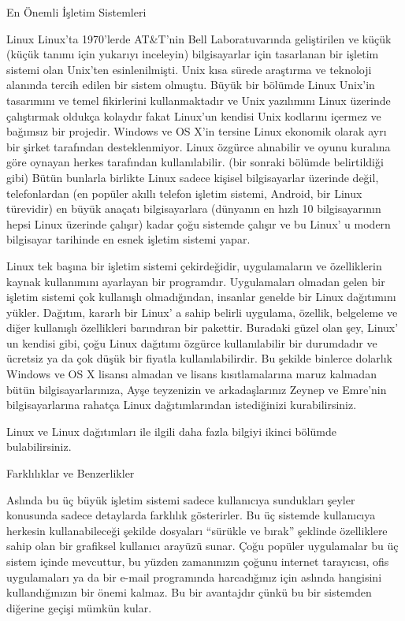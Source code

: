 \begin{section}{En Önemli İşletim Sistemleri}
\begin{subsection}{Linux}
Linux'ta 1970'lerde AT\&T'nin Bell Laboratuvarında geliştirilen ve küçük (küçük tanımı için yukarıyı inceleyin) bilgisayarlar için tasarlanan bir işletim sistemi olan Unix'ten esinlenilmişti. Unix kısa sürede araştırma ve teknoloji alanında tercih edilen bir sistem olmuştu. Büyük bir bölümde Linux Unix'in tasarımını ve temel fikirlerini kullanmaktadır ve Unix yazılımını Linux üzerinde çalıştırmak oldukça kolaydır fakat Linux'un kendisi Unix kodlarını içermez ve bağımsız bir projedir. Windows ve OS X'in tersine Linux ekonomik olarak ayrı bir şirket tarafından desteklenmiyor. Linux özgürce alınabilir ve oyunu kuralına göre oynayan herkes tarafından kullanılabilir. (bir sonraki bölümde belirtildiği gibi) Bütün bunlarla birlikte Linux sadece kişisel bilgisayarlar üzerinde değil, telefonlardan (en popüler akıllı telefon işletim sistemi, Android, bir Linux türevidir) en büyük anaçatı bilgisayarlara (dünyanın en hızlı 10 bilgisayarının hepsi Linux üzerinde çalışır) kadar çoğu sistemde çalışır ve bu Linux' u modern bilgisayar tarihinde en esnek işletim sistemi yapar.

Linux tek başına bir işletim sistemi çekirdeğidir, uygulamaların ve özelliklerin kaynak kullanımını ayarlayan bir programdır. Uygulamaları olmadan gelen bir işletim sistemi çok kullanışlı olmadığından, insanlar genelde bir Linux dağıtımını yükler. Dağıtım, kararlı bir Linux' a sahip belirli uygulama, özellik, belgeleme ve diğer kullanışlı özellikleri barındıran bir pakettir. Buradaki güzel olan şey, Linux' un kendisi gibi, çoğu Linux dağıtımı özgürce kullanılabilir bir durumdadır ve ücretsiz ya da çok düşük bir fiyatla kullanılabilirdir. Bu şekilde binlerce dolarlık Windows ve OS X lisansı almadan ve lisans kısıtlamalarına maruz kalmadan bütün bilgisayarlarınıza, Ayşe teyzenizin ve arkadaşlarınız Zeynep ve Emre'nin bilgisayarlarına rahatça Linux dağıtımlarından istediğinizi kurabilirsiniz.

Linux ve Linux dağıtımları ile ilgili daha fazla bilgiyi ikinci bölümde bulabilirsiniz.
\end{subsection}
\begin{subsection}{Farklılıklar ve Benzerlikler}

Aslında bu üç büyük işletim sistemi sadece kullanıcıya sundukları şeyler konusunda sadece detaylarda farklılık gösterirler. Bu üç sistemde kullanıcıya herkesin kullanabileceği şekilde dosyaları “sürükle ve bırak” şeklinde özelliklere sahip olan bir grafiksel kullanıcı arayüzü sunar. Çoğu popüler uygulamalar bu üç sistem içinde mevcuttur, bu yüzden zamanınızın çoğunu internet tarayıcısı, ofis uygulamaları ya da bir e-mail programında harcadığınız için aslında hangisini kullandığınızın bir önemi kalmaz. Bu bir avantajdır çünkü bu bir sistemden diğerine geçişi mümkün kular.


\end{subsection}
\end{section}
